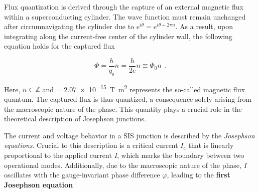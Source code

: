 
Flux quantization is derived through the capture of an external magnetic flux within a superconducting cylinder. The wave function must remain unchanged after circumnavigating the cylinder due to $e^{i\theta} = e^{i\theta + 2\pi n}$. As a result, upon integrating along the current-free center of the cylinder wall, the following equation holds for the captured flux

\begin{equation}
\Phi = \frac{h}{q_\mathrm{s}}n = \frac{h}{2e}n \equiv \Phi_0n \ \ .
\end{equation}


Here, $n\in\mathbb{Z}$ and \unit{\fq} = \qty{2.07e-15}{\tesla\metre\squared} \cite{CODATA2018} represents the so-called magnetic flux quantum. The captured flux is thus quantized, a consequence solely arising from the macroscopic nature of the phase. This quantity plays a crucial role in the theoretical description of Josephson junctions.


The current and voltage behavior in a SIS junction is described by the \textit{Josephson equations}. Crucial to this description is a critical current \textit{$I_\mathrm{c}$} that is linearly proportional to the applied current \textit{I}, which marks the boundary between two operational modes. Additionally, due to the macroscopic nature of the phase, \textit{I} oscillates with the gauge-invariant phase difference $\varphi$, leading to the \textbf{first Josephson equation} \cite{Josephson1965}

